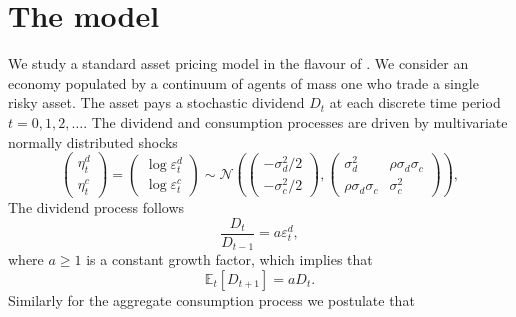 \documentclass[11pt]{article}
\begin{document}
\section{The model}\label{sec:model}


We study a standard \cite{Lucas1978} asset pricing model in the flavour of \cite{Adam2016}.
We consider an economy populated by a continuum of agents of mass one who trade a single risky asset.
The asset pays a stochastic dividend $D_t$ at each discrete time period $t = 0,1,2,\ldots$.
The dividend and consumption processes are driven by multivariate normally distributed shocks
\begin{equation}
    \begin{pmatrix}
    \eta^d_t \\
    \eta^c_t
    \end{pmatrix} 
    =
    \begin{pmatrix}
    \log \varepsilon^d_t \\
    \log \varepsilon^c_t
    \end{pmatrix} \sim \mathcal{N}\left(\begin{pmatrix}
    -\sigma^2_d/2 \\
    -\sigma^2_c/2
    \end{pmatrix}, \begin{pmatrix}
    \sigma^2_d & \rho \sigma_d \sigma_c \\
    \rho \sigma_d \sigma_c & \sigma^2_c
    \end{pmatrix}\right),
\end{equation}
The dividend process follows 
\begin{equation}
    \frac{D_t}{D_{t-1}} = a \varepsilon^d_t,
\end{equation}
where $a \geq 1$ is a constant growth factor, which implies that
\begin{equation}
    \mathbb{E}_t\left[{D_{t+1}}\right] = a D_t.
\end{equation}
Similarly for the aggregate consumption process we postulate that
\end{document}
